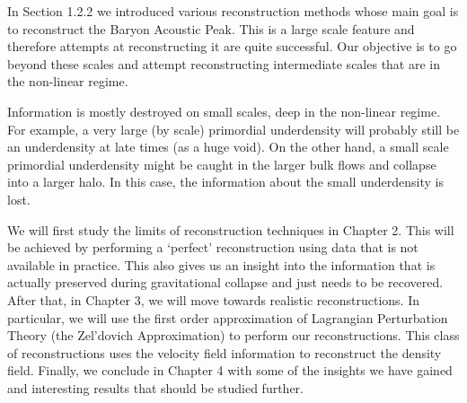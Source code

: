 In Section 1.2.2 we introduced various reconstruction methods whose main goal is to reconstruct the Baryon Acoustic Peak. This is a large scale feature and therefore attempts at reconstructing it are quite successful. Our objective is to go beyond these scales and attempt reconstructing intermediate scales that are in the non-linear regime. 

Information is mostly destroyed on small scales, deep in the non-linear regime. For example, a very large (by scale) primordial underdensity will probably still be an underdensity at late times (as a huge void). On the other hand, a small scale primordial underdensity might be caught in the larger bulk flows and collapse into a larger halo. In this case, the information about the small underdensity is lost. 

We will first study the limits of reconstruction techniques in Chapter 2. This will be achieved by performing a `perfect' reconstruction using data that is not available in practice. This also gives us an insight into the information that is actually preserved during gravitational collapse and just needs to be recovered. After that, in Chapter 3, we will move towards realistic reconstructions. In particular, we will use the first order approximation of Lagrangian Perturbation Theory (the Zel'dovich Approximation) to perform our reconstructions. This class of reconstructions uses the velocity field information to reconstruct the density field. Finally, we conclude in Chapter 4 with some of the insights we have gained and interesting results that should be studied further.

